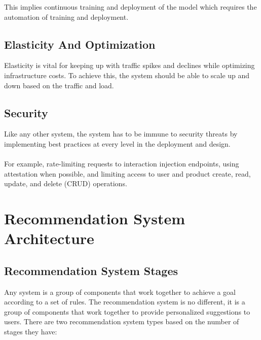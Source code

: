 This implies continuous training and deployment of the model which requires the automation of training and deployment.

\subsection{Elasticity And Optimization}

Elasticity is vital for keeping up with traffic spikes and declines while optimizing infrastructure costs. To achieve this, the system should be able to scale up and down based on the traffic and load.

\subsection{Security}

Like any other system, the system has to be immune to security threats by implementing best practices at every level in the deployment and design. \\ \\
For example, rate-limiting requests to interaction injection endpoints, using attestation when possible, and limiting access to user and product create, read, update, and delete (CRUD) operations.
 

\section{Recommendation System Architecture}
\subsection{Recommendation System Stages}
Any system is a group of components that work together to achieve a goal according to a set of rules. The recommendation system is no different, it is a group of components that work together to provide personalized suggestions to users. There are two recommendation system types based on the number of stages they have:
